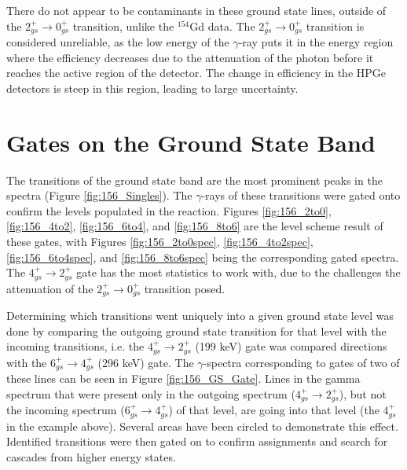 \afterpage{}

There do not appear to be contaminants in these ground state lines, outside of the $2_{gs}^+\rightarrow0_{gs}^+$ transition, unlike the $^{154}$Gd data. The $2^+_{gs}\rightarrow 0^+_{gs}$ transition is considered unreliable, as the low energy of the $\gamma$-ray puts it in the energy region where the efficiency decreases due to the attenuation of the photon before it reaches the active region of the detector. The change in efficiency in the HPGe detectors is steep in this region, leading to large uncertainty.

\section{Gates on the Ground State Band}

The transitions of the ground state band are the most prominent peaks in the spectra (Figure \ref{fig:156_Singles}). The $\gamma$-rays of these transitions were gated onto confirm the levels populated in the reaction. Figures \ref{fig:156_2to0}, \ref{fig:156_4to2}, \ref{fig:156_6to4}, and \ref{fig:156_8to6} are the level scheme result of these gates, with Figures \ref{fig:156_2to0spec}, \ref{fig:156_4to2spec}, \ref{fig:156_6to4spec}, and \ref{fig:156_8to6spec} being the corresponding gated spectra. The $4_{gs}^+\rightarrow2_{gs}^+$ gate has the most statistics to work with, due to the challenges the attenuation of the $2^+_{gs}\rightarrow0_{gs}^+$ transition posed. 

\afterpage{\clearpage}

\afterpage{\clearpage}

\afterpage{\clearpage}

\afterpage{\clearpage}

Determining which transitions went uniquely into a given ground state level was done by comparing the outgoing ground state transition for that level with the incoming transitions, i.e. the $4_{gs}^+\rightarrow2_{gs}^+$ (199 keV) gate was compared directions with the $6_{gs}^+\rightarrow4_{gs}^+$ (296 keV) gate. The $\gamma$-spectra corresponding to gates of two of these lines can be seen in Figure \ref{fig:156_GS_Gate}. Lines in the gamma spectrum that were present only in the outgoing spectrum ($4_{gs}^+\rightarrow2_{gs}^+$), but not the incoming spectrum ($6_{gs}^+\rightarrow4_{gs}^+$) of that level, are going into that level (the $4_{gs}^+$ in the example above). Several areas have been circled to demonstrate this effect. Identified transitions were then gated on to confirm assignments and search for cascades from higher energy states.

